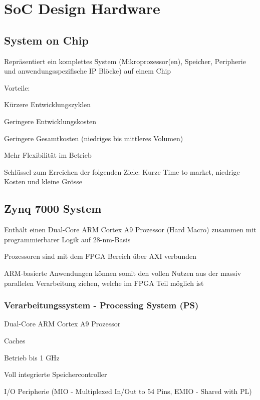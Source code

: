 \section{SoC Design Hardware}
\subsection{System on Chip}
\begin{compactitem}
    \item Repräsentiert ein komplettes System (Mikroprozessor(en), Speicher, Peripherie und anwendungsspezifische IP Blöcke) auf einem Chip
    \item Vorteile:
        \begin{compactitem}
            \item Kürzere Entwicklungszyklen
            \item Geringere Entwicklungskosten
            \item Geringere Gesamtkosten (niedriges bis mittleres Volumen)
            \item Mehr Flexibilität im Betrieb
        \end{compactitem}
    \item Schlüssel zum Erreichen der folgenden Ziele: Kurze Time to market, niedrige Kosten und kleine Grösse
\end{compactitem}
\begin{multicols}{2}
    \subsection{Zynq 7000 System}
    \begin{compactitem}
        \item Enthält einen Dual-Core ARM Cortex A9 Prozessor (Hard Macro) zusammen mit programmierbarer Logik auf 28-nm-Basis
        \item Prozessoren sind mit dem FPGA Bereich über AXI verbunden
        \item ARM-basierte Anwendungen können somit den vollen Nutzen aus der massiv parallelen Verarbeitung ziehen, welche im FPGA Teil möglich ist
    \end{compactitem}
    \subsubsection{Verarbeitungssystem - Processing System (PS)}
    \begin{compactitem}
        \item Dual-Core ARM Cortex A9 Prozessor
        \item Caches
        \item Betrieb bis 1 GHz
        \item Voll integrierte Speichercontroller
        \item I/O Peripherie (MIO - Multiplexed In/Out to 54 Pins, EMIO - Shared with PL) 
    \end{compactitem}
\end{multicols}
